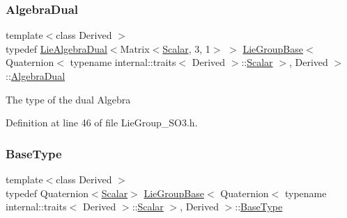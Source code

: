 \subsubsection{\texorpdfstring{Algebra\+Dual}{AlgebraDual}}
{\footnotesize\ttfamily template$<$class Derived $>$ \\
typedef \hyperlink{class_lie_algebra_dual}{Lie\+Algebra\+Dual}$<$Matrix$<$\hyperlink{class_lie_group_base_3_01_quaternion_3_01typename_01internal_1_1traits_3_01_derived_01_4_1_1_scalar_01_4_00_01_derived_01_4_afadeceb3b98e52deecc572e71efb82a8}{Scalar}, 3, 1$>$ $>$ \hyperlink{class_lie_group_base}{Lie\+Group\+Base}$<$ Quaternion$<$ typename internal\+::traits$<$ Derived $>$\+::\hyperlink{class_lie_group_base_3_01_quaternion_3_01typename_01internal_1_1traits_3_01_derived_01_4_1_1_scalar_01_4_00_01_derived_01_4_afadeceb3b98e52deecc572e71efb82a8}{Scalar} $>$, Derived $>$\+::\hyperlink{class_lie_group_base_3_01_quaternion_3_01typename_01internal_1_1traits_3_01_derived_01_4_1_1_scalar_01_4_00_01_derived_01_4_a2ae739f86fece047d4d480127d5b5d55}{Algebra\+Dual}}

The type of the dual Algebra 

Definition at line 46 of file Lie\+Group\+\_\+\+S\+O3.\+h.

\hypertarget{class_lie_group_base_3_01_quaternion_3_01typename_01internal_1_1traits_3_01_derived_01_4_1_1_scalar_01_4_00_01_derived_01_4_a1a65624391a6a8eb63eb312f919c4855}{}\label{class_lie_group_base_3_01_quaternion_3_01typename_01internal_1_1traits_3_01_derived_01_4_1_1_scalar_01_4_00_01_derived_01_4_a1a65624391a6a8eb63eb312f919c4855} 
\subsubsection{\texorpdfstring{Base\+Type}{BaseType}}
{\footnotesize\ttfamily template$<$class Derived $>$ \\
typedef Quaternion$<$\hyperlink{class_lie_group_base_3_01_quaternion_3_01typename_01internal_1_1traits_3_01_derived_01_4_1_1_scalar_01_4_00_01_derived_01_4_afadeceb3b98e52deecc572e71efb82a8}{Scalar}$>$ \hyperlink{class_lie_group_base}{Lie\+Group\+Base}$<$ Quaternion$<$ typename internal\+::traits$<$ Derived $>$\+::\hyperlink{class_lie_group_base_3_01_quaternion_3_01typename_01internal_1_1traits_3_01_derived_01_4_1_1_scalar_01_4_00_01_derived_01_4_afadeceb3b98e52deecc572e71efb82a8}{Scalar} $>$, Derived $>$\+::\hyperlink{class_lie_group_base_3_01_quaternion_3_01typename_01internal_1_1traits_3_01_derived_01_4_1_1_scalar_01_4_00_01_derived_01_4_a1a65624391a6a8eb63eb312f919c4855}{Base\+Type}}

